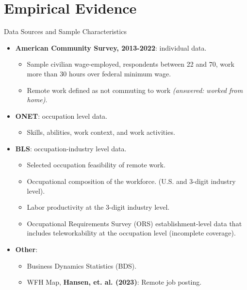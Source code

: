 \documentclass[aspectratio=1610]{beamer}
\begin{document}
\section{Empirical Evidence}

\begin{frame}{Data Sources and Sample Characteristics}
    \begin{itemize}
        \item \textbf{American Community Survey, 2013-2022}: individual data.
        \begin{itemize}
            \item Sample civilian wage-employed, respondents between 22 and 70, work more than 30 hours over federal minimum wage.
            \item Remote work defined as not commuting to work \textit{(answered: worked from home)}.
        \end{itemize} %
        \item \textbf{ONET}: occupation level data.
        \begin{itemize}
            \item Skills, abilities, work context, and work activities.
        \end{itemize}%
        \item \textbf{BLS}: occupation-industry level data.
        \begin{itemize}
            \item Selected occupation feasibility of remote work.
            \item Occupational composition of the workforce. (U.S. and 3-digit industry level).
            \item Labor productivity at the 3-digit industry level.
            \item Occupational Requirements Survey (ORS) establishment-level data that includes teleworkability at the occupation level (incomplete coverage).
        \end{itemize}%
        \item \textbf{Other}:
        \begin{itemize}
            \item Business Dynamics Statistics (BDS).
            \item WFH Map, \textbf{Hansen, et. al. (2023)}: Remote job posting.
        \end{itemize}
    \end{itemize}
\end{frame}
\end{document}
